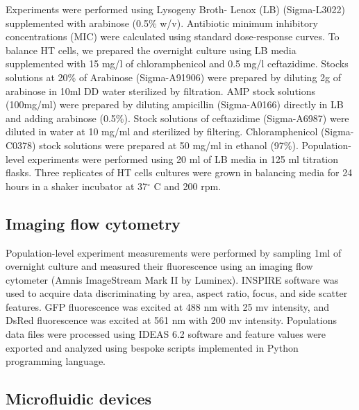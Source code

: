 \documentclass[fleqn,12pt]{wlscirep}
\begin{document}
Experiments were performed using Lysogeny Broth- Lenox (LB) (Sigma-L3022) supplemented with arabinose (0.5\% w/v). 
Antibiotic minimum inhibitory concentrations (MIC) were calculated using standard dose-response curves. 
To balance HT cells, we prepared the overnight culture using LB media supplemented with 15 mg/l of chloramphenicol and 0.5 mg/l ceftazidime. 
Stocks solutions at 20\% of Arabinose (Sigma-A91906) were prepared by diluting 2g of arabinose in 10ml DD water sterilized by filtration. 
AMP stock solutions (100mg/ml) were prepared by diluting ampicillin (Sigma-A0166) directly in LB and adding arabinose (0.5\%). Stock solutions of ceftazidime (Sigma-A6987) were diluted in water at 10 mg/ml and sterilized by filtering. Chloramphenicol (Sigma-C0378) stock solutions were prepared at 50 mg/ml in ethanol (97\%).   
Population-level experiments were performed using 20 ml of LB media in 125 ml titration flasks. Three replicates of HT cells cultures were grown in balancing media for 24 hours in a shaker incubator at 37$^{\circ}$ C and 200 rpm. 

\subsection{Imaging flow cytometry}

Population-level experiment measurements were performed by sampling 1ml of overnight culture and measured their fluorescence using an imaging flow cytometer (Amnis ImageStream Mark II by Luminex). INSPIRE software was used to acquire data discriminating by area, aspect ratio, focus, and side scatter features. GFP fluorescence was excited at 488 nm with 25 mv intensity, and DsRed fluorescence was excited at 561 nm with 200 mv intensity. Populations data files were processed using IDEAS 6.2 software and feature values were exported and analyzed using bespoke scripts implemented in Python programming language. 
\subsection{Microfluidic devices}
\end{document}
